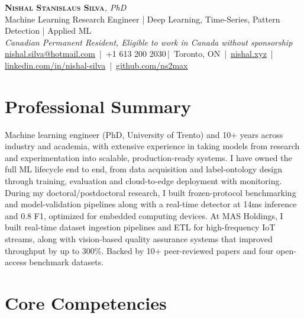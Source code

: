 \documentclass[11pt]{article}
\makeatletter
\newcommand{\cvName}{Nishal Stanislaus Silva}
\newcommand{\cvEmail}{nishal.silva@hotmail.com}
\newcommand{\cvPhone}{+1 613 200 2030}
\newcommand{\cvCity}{Toronto, ON}
\newcommand{\cvSite}{https://nishal.xyz}
\newcommand{\cvLinkedIn}{https://www.linkedin.com/in/nishal-silva}
\newcommand{\cvGitHub}{https://github.com/ns2max}
\newcommand{\cvStatus}{Canadian Permanent Resident, Eligible to work in Canada without sponsorship}
\newcommand{\cvTagline}{Machine Learning Research Engineer | Deep Learning, Time-Series, Pattern Detection | Applied ML}
\makeatother
\begin{document}
\pagestyle{empty}
\begin{center}
    {\LARGE \scshape \textbf{\cvName}}{\large \textit{, PhD}}\\[1pt]
    {\small \cvTagline}\\[1pt]
    {\footnotesize\textit{\cvStatus}}\\[1pt]
    {\small
    \href{mailto:\cvEmail}{\cvEmail} \,|\, \cvPhone \,|\, \cvCity
    \,|\, \href{\cvSite}{nishal.xyz} \,|\, \href{\cvLinkedIn}{linkedin.com/in/nishal-silva}
    \,|\, \href{\cvGitHub}{github.com/ns2max}}
\end{center}

\section*{Professional Summary}

Machine learning engineer (PhD, University of Trento) and 10+ years across industry and academia, with extensive experience in taking models from research and experimentation into scalable, production-ready systems. I have owned the full ML lifecycle end to end, from data acquisition and label-ontology design through training, evaluation and cloud-to-edge deployment with monitoring. During my doctoral/postdoctoral research, I built frozen-protocol benchmarking and model-validation pipelines along with a real-time detector at 14ms inference and 0.8 F1, optimized for embedded computing devices. At MAS Holdings, I built real-time dataset ingestion pipelines and ETL for high-frequency IoT streams, along with vision-based quality assurance systems that improved throughput by up to 300\%. Backed by 10+ peer-reviewed papers and four open-access benchmark datasets.



\section*{Core Competencies}
\end{document}
